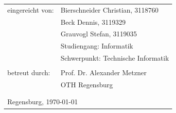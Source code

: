 \hskip 2.0cm
\begin{small}
\begin{tabular}{ll}
eingereicht von:\hspace{0.7cm} & Bierschneider Christian, 3118760 \tabularnewline
 & Beck Dennis, \hspace{1.75cm} 3119329 \tabularnewline
 & Grauvogl Stefan, \hspace{1.15cm} 3119035 \tabularnewline
 & Studiengang: Informatik\tabularnewline
 & Schwerpunkt: Technische Informatik \tabularnewline
 & \tabularnewline
 
 
betreut durch: & Prof. Dr. Alexander Metzner\tabularnewline
 & OTH Regensburg\tabularnewline
 & \tabularnewline
  & \tabularnewline
\multicolumn{2}{l}{Regensburg, \today}\tabularnewline
\end{tabular}
\end{small}